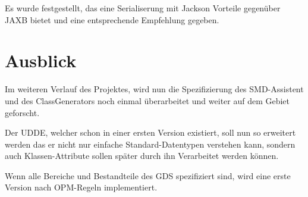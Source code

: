 Es wurde festgestellt, das eine Serialiserung mit Jackson Vorteile gegen\"uber JAXB bietet und eine entsprechende Empfehlung gegeben. 

\section{Ausblick}
Im weiteren Verlauf des Projektes, wird nun die Spezifizierung des SMD-Assistent und des ClassGenerators noch einmal \"uberarbeitet und weiter auf dem Gebiet geforscht. 

Der \ac{UDDE}, welcher schon in einer ersten Version existiert, soll nun so erweitert werden das er nicht nur einfache Standard-Datentypen verstehen kann, sondern auch Klassen-Attribute sollen sp\"ater durch ihn Verarbeitet werden k\"onnen.

Wenn alle Bereiche und Bestandteile des \ac{GDS} spezifiziert sind, wird eine erste Version nach \ac{OPM}-Regeln implementiert.